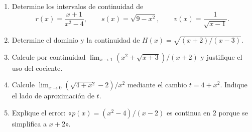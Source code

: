\documentclass[10pt,a5paper]{article}
\newif\ifmostrarSoluciones
\begin{document}
\ifmostrarSoluciones
\begin{solucion}[de continuidad puntual]
\begin{enumerate}
  \item Para $x\neq3$, $h_k(x)=x+3$, de modo que el límite es $6$. Se requiere $k=6$.
  \item En $|x|/x$, los límites laterales son $-1$ y $1$: hay un salto. En $1/x^2$, ambos límites laterales son $+\infty$: la discontinuidad es infinita. Ninguna admite extensión continua en $0$.
  \item En $0$, la continuidad exige $b=2$. En $2$, exige $2a+b=4$. Por tanto, $a=1$, $b=2$. Cada tramo es polinómico, de modo que basta comprobar estos dos puntos de unión.
  \item Se requiere $c=0$, pues el límite por la derecha en $-4$ es $0$. En el resto del dominio, la función radical es continua.
\end{enumerate}
\end{solucion}
\fi

\begin{ejercicios}
\begin{enumerate}
  \item Determine los intervalos de continuidad de
  \[
    r(x)=\frac{x+1}{x^2-4},\qquad
    s(x)=\sqrt{9-x^2},\qquad
    v(x)=\frac{1}{\sqrt{x-1}}.
  \]
  \item Determine el dominio y la continuidad de $H(x)=\sqrt{(x+2)/(x-3)}$.
  \item Calcule por continuidad $\displaystyle\lim_{x\to1}(x^2+\sqrt{x+3})/(x+2)$ y justifique el uso del cociente.
  \item Calcule $\displaystyle\lim_{x\to0}(\sqrt{4+x^2}-2)/x^2$ mediante el cambio $t=4+x^2$. Indique el lado de aproximación de $t$.
  \item Explique el error: «$p(x)=(x^2-4)/(x-2)$ es continua en $2$ porque se simplifica a $x+2$».
\end{enumerate}
\end{ejercicios}
\end{document}
